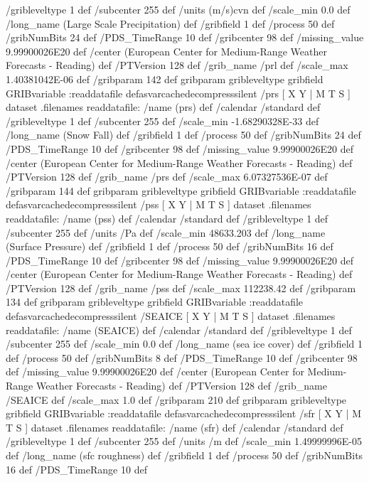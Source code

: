\begin{ingrid}
{{ /gribleveltype 1 def
 /subcenter 255 def
 /units (m/s)cvn def
 /scale_min 0.0 def
 /long_name (Large Scale Precipitation) def
 /gribfield 1 def
 /process 50 def
 /gribNumBits 24 def
 /PDS_TimeRange 10 def
 /gribcenter 98 def
 /missing_value 9.99900026E20 def
 /center (European Center for Medium-Range Weather Forecasts - Reading) def
 /PTVersion 128 def
 /grib_name /prl def
 /scale_max 1.40381042E-06 def
 /gribparam 142 def
 gribparam gribleveltype gribfield GRIBvariable
 :readdatafile
}defasvarcachedecompresssilent
 /prs{
[ X Y | M T S ] dataset .filenames readdatafile:
/name (prs) def
 /calendar /standard def
 /gribleveltype 1 def
 /subcenter 255 def
 /scale_min -1.68290328E-33 def
 /long_name (Snow Fall) def
 /gribfield 1 def
 /process 50 def
 /gribNumBits 24 def
 /PDS_TimeRange 10 def
 /gribcenter 98 def
 /missing_value 9.99900026E20 def
 /center (European Center for Medium-Range Weather Forecasts - Reading) def
 /PTVersion 128 def
 /grib_name /prs def
 /scale_max 6.07327536E-07 def
 /gribparam 144 def
 gribparam gribleveltype gribfield GRIBvariable
 :readdatafile
}defasvarcachedecompresssilent
 /pss{
[ X Y | M T S ] dataset .filenames readdatafile:
/name (pss) def
 /calendar /standard def
 /gribleveltype 1 def
 /subcenter 255 def
 /units /Pa def
 /scale_min 48633.203 def
 /long_name (Surface Pressure) def
 /gribfield 1 def
 /process 50 def
 /gribNumBits 16 def
 /PDS_TimeRange 10 def
 /gribcenter 98 def
 /missing_value 9.99900026E20 def
 /center (European Center for Medium-Range Weather Forecasts - Reading) def
 /PTVersion 128 def
 /grib_name /pss def
 /scale_max 112238.42 def
 /gribparam 134 def
 gribparam gribleveltype gribfield GRIBvariable
 :readdatafile
}defasvarcachedecompresssilent
 /SEAICE{
[ X Y | M T S ] dataset .filenames readdatafile:
/name (SEAICE) def
 /calendar /standard def
 /gribleveltype 1 def
 /subcenter 255 def
 /scale_min 0.0 def
 /long_name (sea ice cover) def
 /gribfield 1 def
 /process 50 def
 /gribNumBits 8 def
 /PDS_TimeRange 10 def
 /gribcenter 98 def
 /missing_value 9.99900026E20 def
 /center (European Center for Medium-Range Weather Forecasts - Reading) def
 /PTVersion 128 def
 /grib_name /SEAICE def
 /scale_max 1.0 def
 /gribparam 210 def
 gribparam gribleveltype gribfield GRIBvariable
 :readdatafile
}defasvarcachedecompresssilent
 /sfr{
[ X Y | M T S ] dataset .filenames readdatafile:
/name (sfr) def
 /calendar /standard def
 /gribleveltype 1 def
 /subcenter 255 def
 /units /m def
 /scale_min 1.49999996E-05 def
 /long_name (sfc roughness) def
 /gribfield 1 def
 /process 50 def
 /gribNumBits 16 def
 /PDS_TimeRange 10 def
}}
\end{ingrid}
